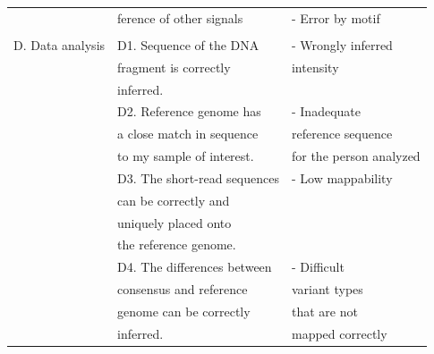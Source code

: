 \begin{table}[H]
\begin{minipage}{\textwidth}
\begin{tabular}{!{\color{deeporange}\VRule[3pt]}lll!{\color{deeporange}\VRule[3pt]}}
			& ference of other signals & - Error by motif \\
			& & \\
			\setrow{\bfseries}D. Data analysis  & D1. Sequence of the DNA & - Wrongly inferred  \\
			& fragment is correctly & intensity \\
			& inferred. & \\
			& D2. Reference genome has & - Inadequate   \\
			& a close match in sequence & reference sequence  \\
			& to my sample of interest.& for the person analyzed \\
			& D3. The short-read sequences & - Low mappability \\
			& can be correctly and & \\
			& uniquely placed onto & \\
			& the reference genome. & \\
			& D4. The differences between & - Difficult \\
			& consensus and reference & variant types \\
			& genome can be correctly & that are not \\
			& inferred. & mapped correctly\\
			\hline
		\end{tabular}
	\end{minipage}
\end{table}

